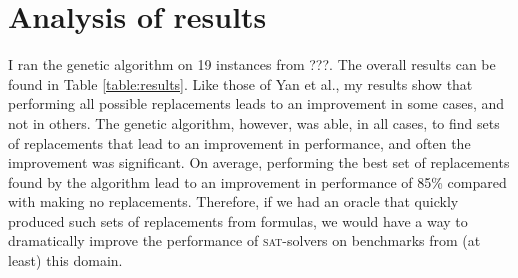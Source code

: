 \documentclass[proof,pdftex,11pt,a4,titlepage]{article}
\newcommand{\sat}{\textsc{sat}}
\begin{document}
\section{Analysis of results}

I ran the genetic algorithm on 19 instances from ???. The overall results can be found in Table \ref{table:results}. Like those of Yan et al., my results show that performing all possible replacements leads to an improvement in some cases, and not in others. The genetic algorithm, however, was able, in all cases, to find sets of replacements that lead to an improvement in performance, and often the improvement was significant. On average, performing the best set of replacements found by the algorithm lead to an improvement in performance of 85\% compared with making no replacements. Therefore, if we had an oracle that quickly produced such sets of replacements from formulas, we would have a way to dramatically improve the performance of \sat{}-solvers on benchmarks from (at least) this domain.
\end{document}
